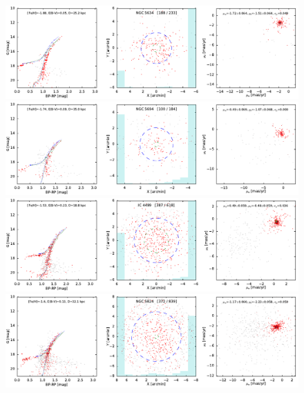 \documentclass[usenatbib]{mnras}
\begin{document}
\clearpage\begin{figure}
\contcaption{}
\includegraphics{figs/NGC_5634.pdf}
\includegraphics{figs/NGC_5694.pdf}
\includegraphics{figs/IC_4499.pdf}
\includegraphics{figs/NGC_5824.pdf}
\end{figure}
\end{document}
